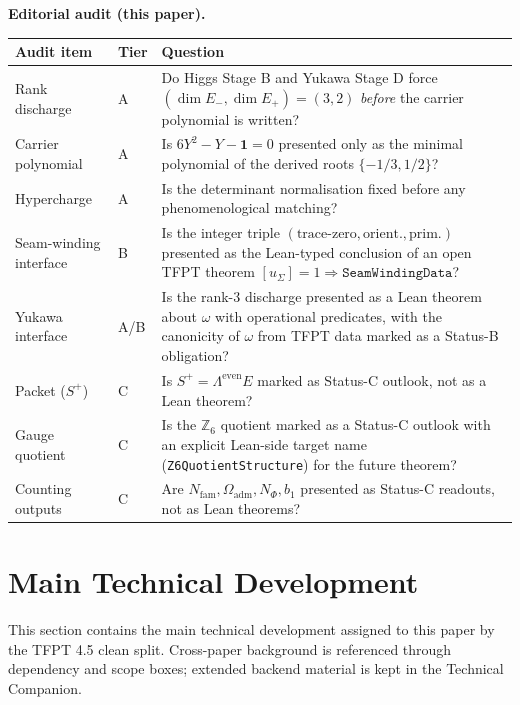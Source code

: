 \smallskip
\noindent\textbf{Editorial audit (this paper).}

\begin{center}
\footnotesize
\begin{tabularx}{\textwidth}{@{}p{}p{}Y@{}}
\toprule
\textbf{Audit item} & \textbf{Tier} & \textbf{Question} \\
\midrule
Rank discharge
  & A
  & Do Higgs Stage B and Yukawa Stage D force $(\dim E_-,\dim E_+)=(3,2)$ \emph{before} the carrier polynomial is written? \\
Carrier polynomial
  & A
  & Is $6Y^2-Y-\mathbf 1=0$ presented only as the minimal polynomial of the derived roots
    $\{-1/3, 1/2\}$? \\
Hypercharge
  & A
  & Is the determinant normalisation fixed before any phenomenological matching? \\
Seam-winding interface
  & B
  & Is the integer triple $(\textrm{trace-zero},\textrm{orient.},\textrm{prim.})$ presented as the
    Lean-typed conclusion of an open TFPT theorem
    $[u_\Sigma]=1 \Rightarrow \texttt{SeamWindingData}$? \\
Yukawa interface
  & A/B
  & Is the rank-3 discharge presented as a Lean theorem about $\omega$ with operational
    predicates, with the canonicity of $\omega$ from TFPT data marked as a Status-B obligation? \\
Packet ($S^+$)
  & C
  & Is $S^+=\Lambda^{\mathrm{even}}E$ marked as Status-C outlook, not as a Lean theorem? \\
Gauge quotient
  & C
  & Is the $\mathbb Z_6$ quotient marked as a Status-C outlook with an explicit Lean-side
    target name (\texttt{Z6QuotientStructure}) for the future theorem? \\
Counting outputs
  & C
  & Are $N_{\mathrm{fam}},\Omega_{\mathrm{adm}},N_\Phi,b_1$ presented as Status-C readouts, not
    as Lean theorems? \\
\bottomrule
\end{tabularx}
\end{center}

\clearpage
\section{Main Technical Development}

This section contains the main technical development assigned to this paper by the TFPT 4.5 clean split. Cross-paper background is referenced through dependency and scope boxes; extended backend material is kept in the Technical Companion.


